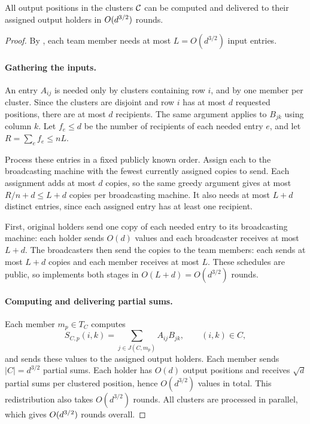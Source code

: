 \begin{lemma}\label{lem:compute-clustered}
	All output positions in the clusters $\mathcal{C}$ can be
	computed and delivered to their assigned output holders in
	$O(d^{3/2})$ rounds.
\end{lemma}
\begin{proof}
	By , each team member needs at most
	$L=O(d^{3/2})$ input entries.

	\paragraph{Gathering the inputs.}
	An entry $A_{ij}$ is needed only by clusters containing row $i$,
	and by one member per cluster. Since the clusters are disjoint
	and row $i$ has at most $d$ requested positions, there are at most
	$d$ recipients. The same argument applies to $B_{jk}$ using
	column $k$. Let $f_e\le d$ be the number of recipients of each
	needed entry $e$, and let $R=\sum_e f_e\leq nL$.

	Process these entries in a fixed publicly known order. Assign each
	to the broadcasting machine with the fewest currently assigned
	copies to send.
	Each assignment adds at most $d$ copies, so the same greedy
	argument gives at most $R/n+d\le L+d$ copies per broadcasting
	machine. It also needs at most $L+d$ distinct entries, since
	each assigned entry has at least one recipient.

	First, original holders send one copy of each needed entry to
	its broadcasting machine: each holder sends $O(d)$ values and
	each broadcaster receives at most $L+d$. The broadcasters then
	send the copies to the team members: each sends at most $L+d$
	copies and each member receives at most $L$. These schedules
	are public, so  implements both
	stages in $O(L+d)=O(d^{3/2})$ rounds.

	\paragraph{Computing and delivering partial sums.}
	Each member $m_p\in T_C$ computes
	\[
	  S_{C,p}(i,k)=\sum_{j\in J(C,m_p)}A_{ij}B_{jk},
	  \qquad (i,k)\in C,
	\]
	and sends these values to the assigned output holders.
	Each member sends $|C|=d^{3/2}$ partial sums. Each holder has
	$O(d)$ output positions and receives $\sqrt d$ partial sums
	per clustered position, hence $O(d^{3/2})$ values in total.
	This redistribution also takes $O(d^{3/2})$ rounds. All clusters are
	processed in parallel, which gives $O(d^{3/2})$ rounds overall.
\end{proof}



